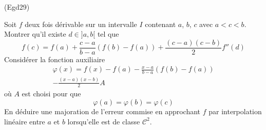 \begin{tiny}(Egd29)\end{tiny} Soit $f$ deux fois dérivable sur un intervalle $I$ contenant $a$, $b$, $c$ avec $a<c<b$. Montrer qu'il existe $d\in ]a,b[$ tel que
\begin{displaymath}
 f(c) = f(a) +\frac{c-a}{b-a}\left( f(b)-f(a)\right)+\frac{(c-a)(c-b)}{2}f''(d) 
\end{displaymath}
Considérer la fonction auxiliaire
\begin{multline*}
 \varphi(x) = f(x) -f(a) -\frac{x-a}{b-a}\left( f(b)-f(a)\right)\\
-\frac{(x-a)(x-b)}{2}A
\end{multline*}
où $A$ est choisi pour que 
\begin{displaymath}
 \varphi(a) = \varphi(b) = \varphi(c)
\end{displaymath}
En déduire une majoration de l'erreur commise en approchant $f$ par interpolation linéaire entre $a$ et $b$ lorsqu'elle est de classe $\mathcal{C}^2$.